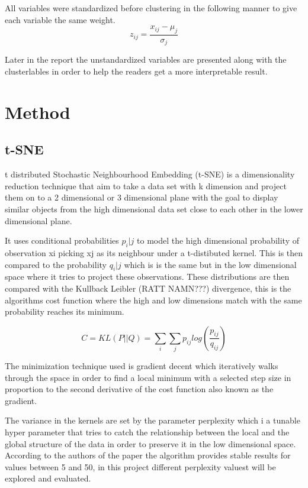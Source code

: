 \documentclass{article}
\begin{document}
 All variables were standardized before clustering in the following manner to give each variable the same weight.
 $$z_{ij} = \frac{x_{ij} - \mu_{j}}{\sigma_{j}}$$ 

Later in the report the unstandardized variables are presented along with the clusterlables in order to help the readers get a more interpretable result.

\newpage


\section{Method}

\subsection{t-SNE}


t distributed Stochastic Neighbourhood Embedding (t-SNE) is a dimensionality reduction technique that aim to take a data set with k dimension and project them on to a 2 dimensional or 3 dimensional plane with the goal to display similar objects from the high dimensional data set close to each other in the lower dimensional plane. 

It uses conditional probabilities $p_i|j$ to model the high dimensional probability of observation xi picking xj as its neighbour under a t-distibuted kernel. This is then compared to the probability $q_i|j$  which is is the same but in the low dimensional space where it tries to project these observations. These distributions are then compared with the Kullback Leibler (RATT NAMN???) divergence, this is the algorithms cost function where the high and low dimensions match with the same probability reaches its minimum. 

$$C = KL(P||Q)=\sum_i\sum_jp_{ij}log(\frac{p_{ij}}{q_{ij}})$$

The minimization technique used is gradient decent which iteratively walks through the space in order to find a local minimum with a selected step size in proportion to the second derivative of the cost function also known as the gradient.

The variance in the kernels are set by the parameter perplexity which i a tunable hyper parameter that tries to catch the relationship between the local and the global structure of the data in order to preserve it in the low dimensional space. According to the authors of the paper the algorithm provides stable results for values between 5 and 50, in this project different perplexity valuest will be explored and evaluated. 
\end{document}
